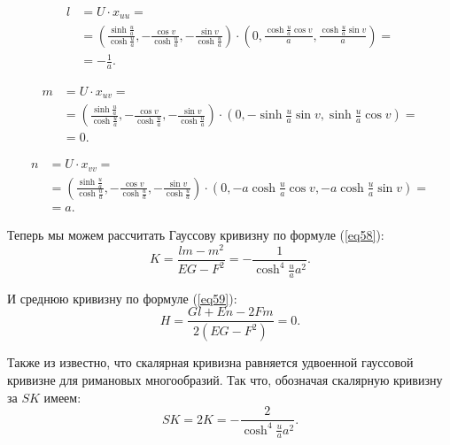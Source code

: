 \documentclass[14pt,a4paper]{extarticle}
\begin{document}
\begin{equation}\label{eq64}
\begin{split}
	l &= U \cdot x_{uu} = \\
	&=  (\frac{\sinh{\frac{u}{a}}}{\cosh{\frac{u}{a}}},-\frac{\cos{v}}{\cosh{\frac{u}{a}}} ,-\frac{\sin{v}}{\cosh{\frac{u}{a}}}) \cdot (0, \frac{\cosh{\frac{u}{a}}\cos{v}}{a}, \frac{\cosh{\frac{u}{a}}\sin{v}}{a}) = \\
	&= -\frac{1}{a}.
\end{split}
\end{equation}

\begin{equation}\label{eq65}
\begin{split}
	m &= U \cdot x_{uv} = \\
	&=  (\frac{\sinh{\frac{u}{a}}}{\cosh{\frac{u}{a}}},-\frac{\cos{v}}{\cosh{\frac{u}{a}}} ,-\frac{\sin{v}}{\cosh{\frac{u}{a}}}) \cdot (0, -\sinh{\frac{u}{a}}\sin{v}, \sinh{\frac{u}{a}}\cos{v}) = \\
	&= 0.
\end{split}
\end{equation}


\begin{equation}\label{eq66}
\begin{split}
	n &= U \cdot x_{vv} = \\
	&=  (\frac{\sinh{\frac{u}{a}}}{\cosh{\frac{u}{a}}},-\frac{\cos{v}}{\cosh{\frac{u}{a}}} ,-\frac{\sin{v}}{\cosh{\frac{u}{a}}}) \cdot (0, -a\cosh{\frac{u}{a}}\cos{v}, -a\cosh{\frac{u}{a}}\sin{v}) = \\
	&= a.
\end{split}
\end{equation}

Теперь мы можем рассчитать Гауссову кривизну по формуле (\ref{eq58}):
\begin{equation}\label{eq67}
	K = \frac{lm - m^2}{EG-F^2} = - \frac{1}{\cosh^4{\frac{u}{a}}a^2}.
\end{equation}

И среднюю кривизну по формуле (\ref{eq59}):
\begin{equation}\label{eq68}
	H = \frac{Gl + En -2Fm}{2(EG-F^2)} = 0.
\end{equation}


Также из \cite{Oprea} известно, что скалярная кривизна равняется удвоенной гауссовой кривизне для римановых многообразий. Так что, обозначая скалярную кривизну за $SK$ имеем:
\begin{equation}\label{eq69}
	SK = 2K  = - \frac{2}{\cosh^4{\frac{u}{a}}a^2}.
\end{equation}
\end{document}
